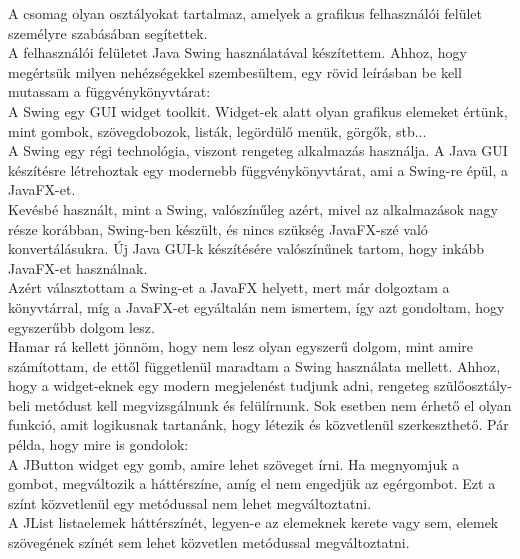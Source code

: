 A csomag olyan osztályokat tartalmaz, amelyek a grafikus felhasználói felület személyre szabásában segítettek. 
\\A felhasználói felületet Java Swing használatával készítettem. Ahhoz, hogy megértsük milyen nehézségekkel szembesültem, egy rövid leírásban be kell mutassam a függvénykönyvtárat:
\vspace{10pt}\\A Swing egy GUI widget toolkit. Widget-ek alatt olyan grafikus elemeket értünk, mint gombok, szövegdobozok, listák, legördülő menük, görgők, stb...
\\A Swing egy régi technológia, viszont rengeteg alkalmazás használja. A Java GUI készítésre létrehoztak egy modernebb függvénykönyvtárat, ami a Swing-re épül, a JavaFX-et.
\\Kevésbé használt, mint a Swing, valószínűleg azért, mivel az alkalmazások nagy része korábban, Swing-ben készült, és nincs szükség JavaFX-szé való konvertálásukra. Új Java GUI-k készítésére valószínűnek tartom, hogy inkább JavaFX-et használnak.
\vspace{10pt}\\Azért választottam a Swing-et a JavaFX helyett, mert már dolgoztam a könyvtárral, míg a JavaFX-et egyáltalán nem ismertem, így azt gondoltam, hogy egyszerűbb dolgom lesz.
\\Hamar rá kellett jönnöm, hogy nem lesz olyan egyszerű dolgom, mint amire számítottam, de ettől függetlenül maradtam a Swing használata mellett. Ahhoz, hogy a widget-eknek egy modern megjelenést tudjunk adni, rengeteg szülőosztály-beli metódust kell megvizsgálnunk és felülírnunk. Sok esetben nem érhető el olyan funkció, amit logikusnak tartanánk, hogy létezik és közvetlenül szerkeszthető. Pár példa, hogy mire is gondolok:
\vspace{5pt}\\A JButton widget egy gomb, amire lehet szöveget írni. Ha megnyomjuk a gombot, megváltozik a háttérszíne, amíg el nem engedjük az egérgombot. Ezt a színt közvetlenül egy metódussal nem lehet megváltoztatni.
\\A JList listaelemek háttérszínét, legyen-e az elemeknek kerete vagy sem, elemek szövegének színét sem lehet közvetlen metódussal megváltoztatni.

